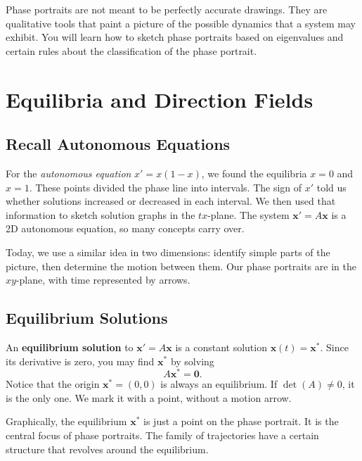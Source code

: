 \documentclass[11pt,letterpaper]{article}
\begin{document}
Phase portraits are not meant to be perfectly accurate drawings. They are qualitative tools that paint a picture of the possible dynamics that a system may exhibit. You will learn how to sketch phase portraits based on eigenvalues and certain rules about the classification of the phase portrait.

\section{Equilibria and Direction Fields}

\subsection{Recall Autonomous Equations}
For the \textit{autonomous equation} $x'=x(1-x)$, we found the equilibria $x=0$ and
$x=1$. These points divided the phase line into intervals. The sign of $x'$
told us whether solutions increased or decreased in each interval. We then used that information to sketch solution graphs in the $tx$-plane. The system $\textbf{x}'=A\textbf{x}$ is a 2D autonomous equation, so many concepts carry over.

Today, we use a similar idea in two dimensions: identify simple parts of the
picture, then determine the motion between them. Our phase portraits are
in the $xy$-plane, with time represented by arrows.

\subsection{Equilibrium Solutions}
An \textbf{equilibrium solution} to $\textbf{x}'=A\textbf{x}$ is a constant solution
$\mathbf{x}(t)=\mathbf{x}^*$. Since its derivative is zero, you may find $\textbf{x}^*$ by solving
\[
    \boxed{A\mathbf{x}^*=\mathbf0.}
\]
Notice that the origin $\textbf{x}^*=(0,0)$ is always an equilibrium. If $\det(A)\ne0$, it is the only one. We mark it with a point, without a motion arrow. 

Graphically, the equilibrium $\textbf{x}^*$ is just a point on the phase portrait. It is the central focus of phase portraits. The family of trajectories have a certain structure that revolves around the equilibrium.
\end{document}
